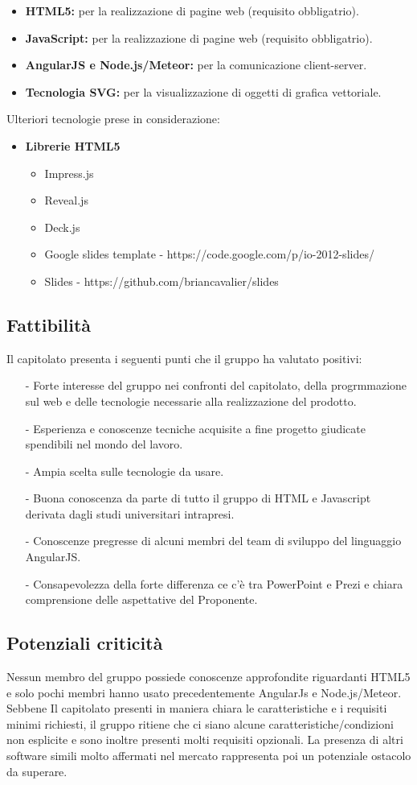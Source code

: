 \begin{itemize}
	\item \textbf{HTML5:} per la realizzazione di pagine web (requisito obbligatrio).
	\item \textbf{JavaScript:} per la realizzazione di pagine web (requisito obbligatrio).
	\item \textbf{AngularJS e Node.js/Meteor:} per la comunicazione client-server.
	\item \textbf{Tecnologia SVG:} per la visualizzazione di oggetti di grafica vettoriale.
\end{itemize}
Ulteriori tecnologie prese in considerazione:
\begin{itemize}
	\item \textbf{Librerie HTML5}
	\begin{itemize}
		\item Impress.js
		\item Reveal.js
		\item Deck.js
		\item Google slides template - https://code.google.com/p/io-2012-slides/
		\item Slides - https://github.com/briancavalier/slides
	\end{itemize}
\end{itemize}

\subsection{Fattibilità}
Il capitolato presenta i seguenti punti che il gruppo ha valutato positivi:
\begin{itemize}
	\item[-] Forte interesse del gruppo nei confronti del capitolato, della progrmmazione sul web e delle tecnologie necessarie alla realizzazione del prodotto.
	\item[-] Esperienza e conoscenze tecniche acquisite a fine progetto giudicate spendibili nel mondo del lavoro.
	\item[-] Ampia scelta sulle tecnologie da usare.
	\item[-] Buona conoscenza da parte di tutto il gruppo di HTML e Javascript derivata dagli studi universitari intrapresi.
	\item[-] Conoscenze pregresse di alcuni membri del team di sviluppo del linguaggio AngularJS.
	\item[-] Consapevolezza della forte differenza ce c'è tra PowerPoint e Prezi e chiara comprensione delle aspettative del Proponente.
\end{itemize}

\subsection{Potenziali criticità}
Nessun membro del gruppo possiede conoscenze approfondite riguardanti HTML5 e solo pochi membri hanno usato precedentemente AngularJs e Node.js/Meteor. Sebbene Il capitolato presenti in maniera chiara le caratteristiche e i requisiti minimi richiesti, il gruppo ritiene che ci siano alcune caratteristiche/condizioni non esplicite e sono inoltre presenti molti requisiti opzionali. La presenza di altri software simili molto affermati nel mercato rappresenta poi un potenziale ostacolo da superare.
